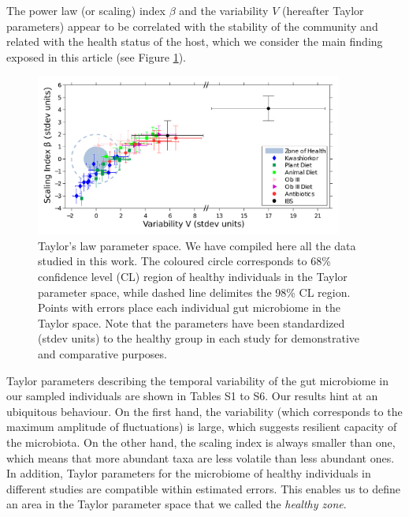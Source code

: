 The power law (or scaling) index $\beta$ and the variability $V$ (hereafter Taylor parameters) appear to be correlated with the stability of the community and related with the health status of the host, which we consider the main finding exposed in this article (see Figure \ref{fig:main2}).

\begin{figure}
	\centering
	\includegraphics[width=0.9\textwidth]{results/finalplot11.pdf}
	\caption{Taylor's law parameter space. We have compiled here all the data studied in this work. The coloured circle corresponds to 68\% confidence level (CL) region of healthy individuals in the Taylor parameter space, while dashed line delimites the 98\% CL region. Points with errors place each individual gut microbiome in the Taylor space. Note that the parameters have been standardized (stdev units) to the healthy group in each study for demonstrative and comparative purposes.}
	\label{fig:main2}
\end{figure}

Taylor parameters describing the temporal variability of the gut microbiome in our sampled individuals are shown in Tables S1 to S6. Our results hint at an ubiquitous behaviour. On the first hand, the variability (which corresponds to the maximum amplitude of fluctuations) is large, which suggests resilient capacity of the microbiota. On the other hand, the scaling index is always smaller than one, which means that more abundant taxa are less volatile than less abundant ones. In addition, Taylor parameters for the microbiome of healthy individuals in different studies are compatible within estimated errors. This enables us to define an area in the Taylor parameter space that we called the \emph{healthy zone}.

